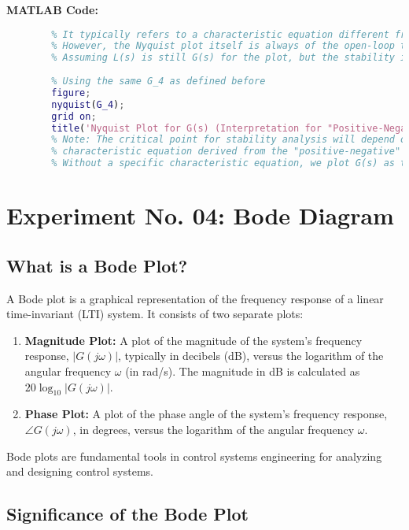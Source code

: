 \documentclass[a4paper,12pt]{article}
\begin{document}
	\textbf{MATLAB Code:}
	\begin{lstlisting}[language=Matlab, caption=MATLAB Code for Problem 4(iii) (Unity Positive-Negative System)]
		% The term "unity positive-negative system" is ambiguous in standard control theory.
		% It typically refers to a characteristic equation different from 1+G(s)=0 or 1-G(s)=0.
		% However, the Nyquist plot itself is always of the open-loop transfer function L(s).
		% Assuming L(s) is still G(s) for the plot, but the stability interpretation changes.
		
		% Using the same G_4 as defined before
		figure;
		nyquist(G_4);
		grid on;
		title('Nyquist Plot for G(s) (Interpretation for "Positive-Negative System" Varies)');
		% Note: The critical point for stability analysis will depend on the exact
		% characteristic equation derived from the "positive-negative" feedback.
		% Without a specific characteristic equation, we plot G(s) as the base.
	\end{lstlisting}
	\newpage
	
	\section*{Experiment No. 04: Bode Diagram}
	
	\subsection*{What is a Bode Plot?}
	
	A Bode plot is a graphical representation of the frequency response of a linear time-invariant (LTI) system. It consists of two separate plots:
	\begin{enumerate}
		\item \textbf{Magnitude Plot:} A plot of the magnitude of the system's frequency response, $|G(j\omega)|$, typically in decibels (dB), versus the logarithm of the angular frequency $\omega$ (in rad/s). The magnitude in dB is calculated as $20 \log_{10} |G(j\omega)|$.
		\item \textbf{Phase Plot:} A plot of the phase angle of the system's frequency response, $\angle G(j\omega)$, in degrees, versus the logarithm of the angular frequency $\omega$.
	\end{enumerate}
	Bode plots are fundamental tools in control systems engineering for analyzing and designing control systems.
	
	\subsection*{Significance of the Bode Plot}
	
\end{document}

